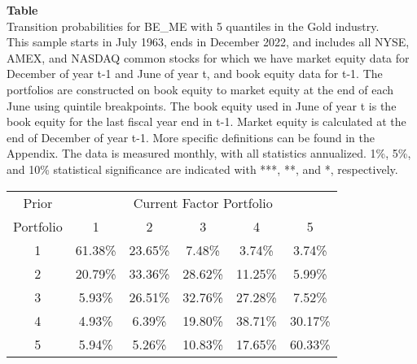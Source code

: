 \begin{table*}[ht!]
\raggedright
{}
\label{tab: transition_probs_BE_ME_Gold_with_5_quantiles}
\textbf{Table \thetable} \\
Transition probabilities for BE_ME with 5 quantiles in the Gold industry. \\
\hspace*{1em}This sample starts in July 1963, ends in December 2022, and includes all NYSE, AMEX, and NASDAQ common stocks for which we have market equity data for December of year t-1 and June of year t, and book equity data for t-1. The portfolios are constructed on book equity to market equity at the end of each June using quintile breakpoints.  The book equity used in June of year t is the book equity for the last fiscal year end in t-1.  Market equity is calculated at the end of December of year t-1.  More specific definitions can be found in the Appendix.  The data is measured monthly, with all statistics annualized.  1\%, 5\%, and 10\% statistical significance are indicated with ***, **, and *, respectively. \\
\vspace{0.5em}
\centering
\begin{adjustbox}{max width=\textwidth}
\begin{tabular}{@{}cccccc@{}}
\toprule
Prior & \multicolumn{5}{c}{Current Factor Portfolio} \\
Portfolio & 1 & 2 & 3 & 4 & 5 \\
\midrule
1 & 61.38\% & 23.65\% & 7.48\% & 3.74\% & 3.74\% \\
2 & 20.79\% & 33.36\% & 28.62\% & 11.25\% & 5.99\% \\
3 & 5.93\% & 26.51\% & 32.76\% & 27.28\% & 7.52\% \\
4 & 4.93\% & 6.39\% & 19.80\% & 38.71\% & 30.17\% \\
5 & 5.94\% & 5.26\% & 10.83\% & 17.65\% & 60.33\% \\
\bottomrule
\end{tabular}
\end{adjustbox}
\end{table*}